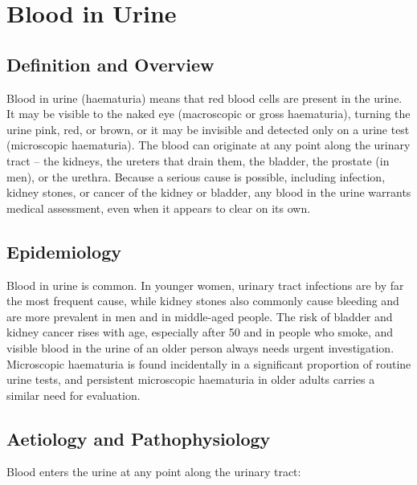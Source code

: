 \chapter{Blood in Urine}

\section*{Definition and Overview}
Blood in urine (haematuria) means that red blood cells are present in the urine. It may be visible to the naked eye (macroscopic or gross haematuria), turning the urine pink, red, or brown, or it may be invisible and detected only on a urine test (microscopic haematuria). The blood can originate at any point along the urinary tract -- the kidneys, the ureters that drain them, the bladder, the prostate (in men), or the urethra. Because a serious cause is possible, including infection, kidney stones, or cancer of the kidney or bladder, any blood in the urine warrants medical assessment, even when it appears to clear on its own.

\section*{Epidemiology}
Blood in urine is common. In younger women, urinary tract infections are by far the most frequent cause, while kidney stones also commonly cause bleeding and are more prevalent in men and in middle-aged people. The risk of bladder and kidney cancer rises with age, especially after 50 and in people who smoke, and visible blood in the urine of an older person always needs urgent investigation. Microscopic haematuria is found incidentally in a significant proportion of routine urine tests, and persistent microscopic haematuria in older adults carries a similar need for evaluation.

\section*{Aetiology and Pathophysiology}
Blood enters the urine at any point along the urinary tract:

